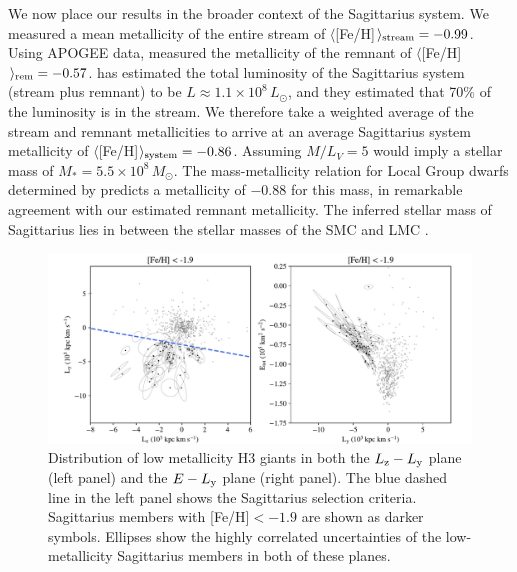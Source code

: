 \documentclass[twocolumn,tighten,twocolappendix]{aastex63}
\newcommand{\sgr}{Sagittarius}
\newcommand{\Ly}{L_{\rm y}}
\newcommand{\Lz}{L_{\rm z}}
\newcommand{\Msun}{\,M_{\odot}}
\begin{document}
\begin{CJK*}{UTF8}{gbsn}
We now place our results in the broader context of the \sgr{} system.  We measured a mean metallicity of the entire stream of $\langle$[Fe/H]$\rangle_{\rm stream}=-0.99$.  Using APOGEE data, \citet{Hayes20} measured the metallicity of the remnant of $\langle$[Fe/H]$\rangle_{\rm rem}=-0.57$.  \citet{Niederste-Ostholt10} has estimated the total luminosity of the \sgr{} system (stream plus remnant) to be $L\approx1.1\times10^8\, L_{\odot}$, and they estimated that 70\% of the luminosity is in the stream.  We therefore take a weighted average of the stream and remnant metallicities to arrive at an average \sgr{} system metallicity of $\langle$[Fe/H]$\rangle_{\rm system}=-0.86$.  Assuming $M/L_V=5$ would imply a stellar mass of $M_\ast=5.5\times10^8\, M_\odot$.  The mass-metallicity relation for Local Group dwarfs determined by \citet{Kirby13} predicts a metallicity of $-0.88$ for this mass, in remarkable agreement with our estimated remnant metallicity.  The inferred stellar mass of Sagittarius lies in between the stellar masses of the SMC \citep[$3\times10^8\, \Msun$;][]{Stanimirovic04} and LMC \citep[$3\times10^9\, \Msun$;][]{vanderMarel02}.


\begin{figure}[t!]
\includegraphics[width=\textwidth]{l_energy_unc.pdf}
\caption{Distribution of low metallicity H3 giants in both the $\Lz-\Ly$ plane (left panel) and the $E-\Ly$ plane (right panel).  The blue dashed line in the left panel shows the \sgr{} selection criteria.  \sgr{} members with [Fe/H]$<-1.9$ are shown as darker symbols.  Ellipses show the highly correlated uncertainties of the low-metallicity \sgr{} members in both of these planes.
\label{fig:kin_unc}}
\end{figure}


\end{CJK*}
\end{document}
